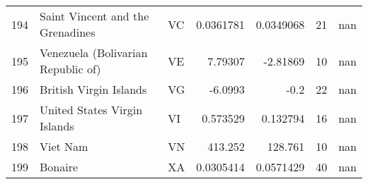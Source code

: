 \begin{tabular}{rllrrrr}
 194 & Saint Vincent and the Grenadines                         & VC         &    0.0361781  &    0.0349068  &     21 &    nan       \\
 195 & Venezuela (Bolivarian Republic of)                       & VE         &    7.79307    &   -2.81869    &     10 &    nan       \\
 196 & British Virgin Islands                                   & VG         &   -6.0993     &   -0.2        &     22 &    nan       \\
 197 & United States Virgin Islands                             & VI         &    0.573529   &    0.132794   &     16 &    nan       \\
 198 & Viet Nam                                                 & VN         &  413.252      &  128.761      &     10 &    nan       \\
 199 & Bonaire                                                  & XA         &    0.0305414  &    0.0571429  &     40 &    nan       \\
\hline
\end{tabular}